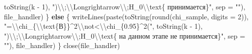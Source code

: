 \documentclass[
]{article}
\newenvironment{Shaded}{\begin{snugshade}}{\end{snugshade}}
\newcommand{\AttributeTok}[1]{\textcolor[rgb]{0.77,0.63,0.00}{#1}}
\newcommand{\ControlFlowTok}[1]{\textcolor[rgb]{0.13,0.29,0.53}{\textbf{#1}}}
\newcommand{\DecValTok}[1]{\textcolor[rgb]{0.00,0.00,0.81}{#1}}
\newcommand{\FunctionTok}[1]{\textcolor[rgb]{0.00,0.00,0.00}{#1}}
\newcommand{\NormalTok}[1]{#1}
\newcommand{\SpecialCharTok}[1]{\textcolor[rgb]{0.00,0.00,0.00}{#1}}
\newcommand{\StringTok}[1]{\textcolor[rgb]{0.31,0.60,0.02}{#1}}
\begin{document}
\begin{Shaded}
\begin{Highlighting}[]
        \FunctionTok{toString}\NormalTok{(k }\SpecialCharTok{{-}} \DecValTok{1}\NormalTok{), }\StringTok{")}\SpecialCharTok{\textbackslash{}\textbackslash{}}\StringTok{;}\SpecialCharTok{\textbackslash{}\textbackslash{}}\StringTok{Longrightarrow}\SpecialCharTok{\textbackslash{}\textbackslash{}}\StringTok{;H\_0}\SpecialCharTok{\textbackslash{}\textbackslash{}}\StringTok{text\{ принимается\}"}\NormalTok{, }\AttributeTok{sep =} \StringTok{""}\NormalTok{), }
\NormalTok{        file\_handler)}
\NormalTok{\} }\ControlFlowTok{else}\NormalTok{ \{}
    \FunctionTok{writeLines}\NormalTok{(}\FunctionTok{paste}\NormalTok{(}\FunctionTok{toString}\NormalTok{(}\FunctionTok{round}\NormalTok{(chi\_sample, }\AttributeTok{digits =} \DecValTok{2}\NormalTok{)), }\StringTok{"=}\SpecialCharTok{\textbackslash{}\textbackslash{}}\StringTok{chi\_\{}\SpecialCharTok{\textbackslash{}\textbackslash{}}\StringTok{text\{В\}\}\^{}2}\SpecialCharTok{\textbackslash{}\textbackslash{}}\StringTok{not\textless{}}\SpecialCharTok{\textbackslash{}\textbackslash{}}\StringTok{chi\_\{0.95\}\^{}2("}\NormalTok{, }
        \FunctionTok{toString}\NormalTok{(k }\SpecialCharTok{{-}} \DecValTok{1}\NormalTok{), }\StringTok{")}\SpecialCharTok{\textbackslash{}\textbackslash{}}\StringTok{;}\SpecialCharTok{\textbackslash{}\textbackslash{}}\StringTok{Longrightarrow}\SpecialCharTok{\textbackslash{}\textbackslash{}}\StringTok{;H\_0}\SpecialCharTok{\textbackslash{}\textbackslash{}}\StringTok{text\{ на данном этапе не принимается\}"}\NormalTok{, }
        \AttributeTok{sep =} \StringTok{""}\NormalTok{), file\_handler)}
\NormalTok{\}}
\FunctionTok{close}\NormalTok{(file\_handler)}
\end{Highlighting}
\end{Shaded}
\end{document}
